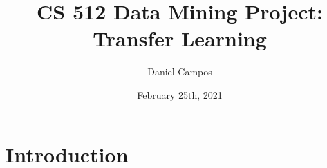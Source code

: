 \documentclass{article}
\title{CS 512 Data Mining Project: Transfer Learning}
\author{Daniel Campos}
\date{February 25th, 2021}
\begin{document}
\maketitle

\section{Introduction}
\end{document}
